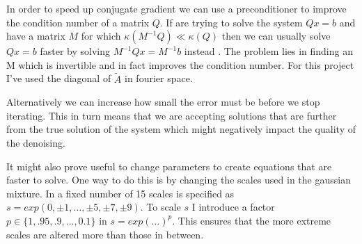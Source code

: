 \documentclass{article}
\begin{document}
In order to speed up conjugate gradient we can use a preconditioner to 
improve the condition number of a matrix $Q$. If are trying to solve the 
system $Qx = b$ and have a matrix $M$ for which $\kappa(M^{-1}Q) \ll 
\kappa(Q)$ then we can usually solve $Qx = b$ faster by solving 
$M^{-1}Qx = M^{-1}b$ instead \citep{pain}. The problem lies in finding 
an M which is invertible and in fact improves the condition number. For 
this project I've used the diagonal of $\tilde{A}$ in fourier space.

Alternatively we can increase how small the error must be before we stop 
iterating. This in turn means that we are accepting solutions that are 
further from the true solution of the system which might negatively 
impact the quality of the denoising.

It might also prove useful to change parameters to create equations that 
are faster to solve. One way to do this is by changing the scales used 
in the gaussian mixture. In \citep{uwe} a fixed number of 15 scales is 
specified as $s = exp(0, \pm1, \ldots, \pm5, \pm7, \pm9)$. To scale $s$ 
I introduce a factor $p \in \{1, .95, .9, \ldots , 0.1\}$ in $s = 
exp(\ldots)^p$. This ensures that the more extreme scales are altered 
more than those in between.
%
%
%





\end{document}
